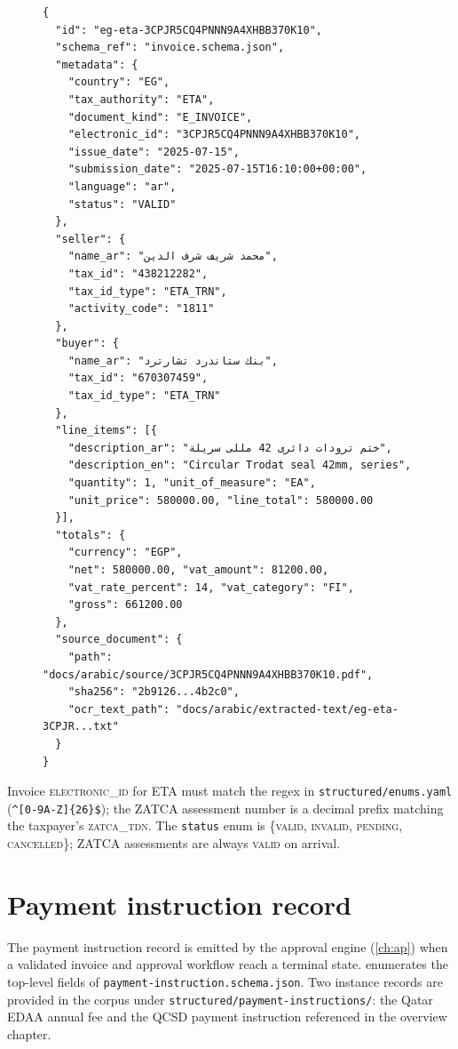 \begin{figure}[htbp]
\begin{lstlisting}[language=jsonx,caption={Full invoice record for the
Egypt ETA seal invoice (\texttt{eg-eta-3CPJR5CQ4PNNN9A4XHBB370K10}).
Arabic strings are UTF-8; the LaTeX engine renders them RTL.},
label=lst:invoice-example]
{
  "id": "eg-eta-3CPJR5CQ4PNNN9A4XHBB370K10",
  "schema_ref": "invoice.schema.json",
  "metadata": {
    "country": "EG",
    "tax_authority": "ETA",
    "document_kind": "E_INVOICE",
    "electronic_id": "3CPJR5CQ4PNNN9A4XHBB370K10",
    "issue_date": "2025-07-15",
    "submission_date": "2025-07-15T16:10:00+00:00",
    "language": "ar",
    "status": "VALID"
  },
  "seller": {
    "name_ar": "محمد شريف شرف الدين",
    "tax_id": "438212282",
    "tax_id_type": "ETA_TRN",
    "activity_code": "1811"
  },
  "buyer": {
    "name_ar": "بنك ستاندرد تشارترد",
    "tax_id": "670307459",
    "tax_id_type": "ETA_TRN"
  },
  "line_items": [{
    "description_ar": "ختم ترودات دائرى 42 مللى سريلة",
    "description_en": "Circular Trodat seal 42mm, series",
    "quantity": 1, "unit_of_measure": "EA",
    "unit_price": 580000.00, "line_total": 580000.00
  }],
  "totals": {
    "currency": "EGP",
    "net": 580000.00, "vat_amount": 81200.00,
    "vat_rate_percent": 14, "vat_category": "FI",
    "gross": 661200.00
  },
  "source_document": {
    "path": "docs/arabic/source/3CPJR5CQ4PNNN9A4XHBB370K10.pdf",
    "sha256": "2b9126...4b2c0",
    "ocr_text_path": "docs/arabic/extracted-text/eg-eta-3CPJR...txt"
  }
}
\end{lstlisting}
\end{figure}

Invoice \textsc{electronic\_id} for ETA must match the regex in
\corpus\texttt{structured/enums.yaml}
(\verb|^[0-9A-Z]{26}$|); the ZATCA assessment number is a decimal prefix
matching the taxpayer's \textsc{zatca\_tdn}. The \texttt{status} enum is
\{\textsc{valid}, \textsc{invalid}, \textsc{pending}, \textsc{cancelled}\};
ZATCA assessments are always \textsc{valid} on arrival.

\section{Payment instruction record}
\label{sec:payment-instruction-schema}

The payment instruction record is emitted by the approval engine
(\cref{ch:ap}) when a validated invoice and approval workflow reach a
terminal state.  enumerates the
top-level fields of \texttt{payment-instruction.schema.json}. Two
instance records are provided in the corpus under
\texttt{structured/payment-instructions/}: the Qatar EDAA annual fee
and the QCSD payment instruction referenced in the overview chapter.

